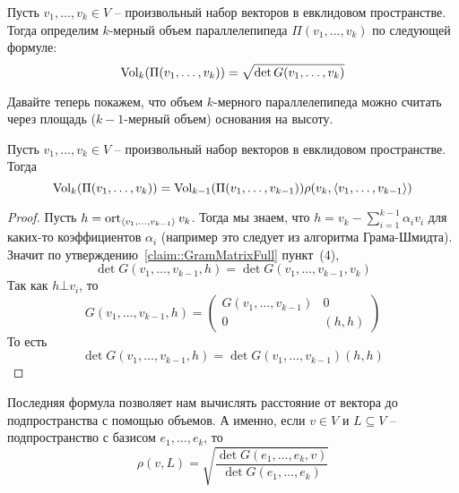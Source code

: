 \begin{definition}
Пусть $v_1,\ldots, v_k\in V$ -- произвольный набор векторов в евклидовом пространстве.
Тогда определим $k$-мерный объем параллелепипеда $\Pi(v_1,\ldots,v_k)$ по следующей формуле:
\[
\operatorname{Vol}_k(\Pi(v_1,\ldots,v_k)) = \sqrt{\det G(v_1,\ldots,v_k)}
\]
\end{definition}

Давайте теперь покажем, что объем $k$-мерного параллелепипеда можно считать через площадь ($k-1$-мерный объем) основания на высоту.

\begin{claim}
Пусть $v_1,\ldots,v_k\in V$ -- произвольный набор векторов в евклидовом пространстве.
Тогда
\[
\operatorname{Vol}_k(\Pi(v_1,\ldots,v_k)) = \operatorname{Vol}_{k-1}(\Pi(v_1,\ldots,v_{k-1}))\rho(v_k, \langle v_1,\ldots,v_{k-1}\rangle)
\] 
\end{claim}
\begin{proof}
Пусть $h = \operatorname{ort}_{\langle v_1,\ldots,v_{k-1}\rangle} v_k$.
Тогда мы знаем, что $h = v_k - \sum_{i=1}^{k-1}\alpha_i v_i$ для каких-то коэффициентов $\alpha_i$ (например это следует из алгоритма Грама-Шмидта).
Значит по утверждению~\ref{claim::GramMatrixFull} пункт~(4),
\[
\det G(v_1,\ldots,v_{k-1}, h) = \det G(v_1,\ldots,v_{k-1},v_k)
\]
Так как $h \bot v_i$, то 
\[
G(v_1,\ldots,v_{k-1}, h) = 
\begin{pmatrix}
{G(v_1,\ldots,v_{k-1})}&{0}\\
{0}&{(h, h)}
\end{pmatrix}
\]
То есть 
\[
\det G(v_1,\ldots,v_{k-1}, h) = \det G(v_1,\ldots, v_{k-1}) (h, h)
\]
\end{proof}

Последняя формула позволяет нам вычислять расстояние от вектора до подпространства с помощью объемов.
А именно, если $v\in V$ и $L\subseteq V$ -- подпространство с базисом $e_1,\ldots,e_k$, то 
\[
\rho(v, L) = \sqrt{\frac{\det G(e_1,\ldots,e_k, v)}{\det G(e_1,\ldots,e_k)}}
\]